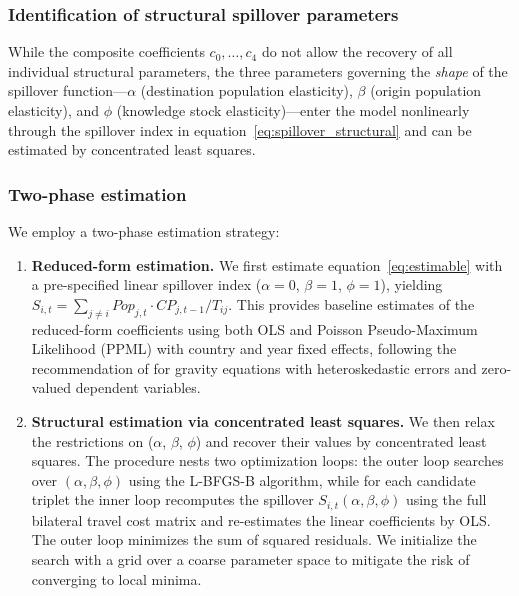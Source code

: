 \documentclass[letterpaper,12pt,leqno]{article}
\begin{document}
\subsubsection*{Identification of structural spillover parameters}

While the composite coefficients \(c_0, \ldots, c_4\) do not allow the recovery of all individual structural parameters, the three parameters governing the {\em shape} of the spillover function---\(\alpha\) (destination population elasticity), \(\beta\) (origin population elasticity), and \(\phi\) (knowledge stock elasticity)---enter the model nonlinearly through the spillover index in equation~\eqref{eq:spillover_structural} and can be estimated by concentrated least squares.

\subsubsection*{Two-phase estimation}

We employ a two-phase estimation strategy:

\begin{enumerate}
  \item \textbf{Reduced-form estimation.} We first estimate equation~\eqref{eq:estimable} with a pre-specified linear spillover index (\(\alpha = 0\), \(\beta = 1\), \(\phi = 1\)), yielding \(S_{i,t} = \sum_{j \neq i} Pop_{j,t} \cdot CP_{j,t-1} / T_{ij}\). This provides baseline estimates of the reduced-form coefficients using both OLS and Poisson Pseudo-Maximum Likelihood (PPML) with country and year fixed effects, following the recommendation of \citet{santos2006log} for gravity equations with heteroskedastic errors and zero-valued dependent variables.

  \item \textbf{Structural estimation via concentrated least squares.} We then relax the restrictions on (\(\alpha\), \(\beta\), \(\phi\)) and recover their values by concentrated least squares. The procedure nests two optimization loops: the outer loop searches over \((\alpha, \beta, \phi)\) using the L-BFGS-B algorithm, while for each candidate triplet the inner loop recomputes the spillover \(S_{i,t}(\alpha, \beta, \phi)\) using the full bilateral travel cost matrix and re-estimates the linear coefficients by OLS. The outer loop minimizes the sum of squared residuals. We initialize the search with a grid over a coarse parameter space to mitigate the risk of converging to local minima.
\end{enumerate}
\end{document}
